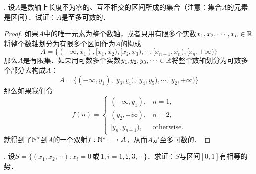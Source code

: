 . 设$A$是数轴上长度不为零的、互不相交的区间所成的集合（注意：集合$A$的元素是区间）．试证：$A$是至多可数的．
\begin{proof}
如果$A$中的唯一元素为整个数轴，或者只用有限多个实数$x_1,x_2,\cdots, x_n \in \mathbb{R}$将整个数轴划分为有限多个区间作为$A$的构成
\begin{equation}
    A = \{ (-\infty, x_1), [x_1, x_2), [x_2, x_3), \cdots, [x_{n-1}, x_n), [x_n, +\infty) \}
\end{equation}
那么$A$是有限集．如果用可数多个实数$y_1, y_2, y_3, \cdots \in \mathbb{R}$将整个数轴划分为可数多个部分去构成$A$：
\begin{equation}
    A = \{ (-\infty, y_1), [y_3, y_4), [y_4, y_5), \cdots, [y_2, +\infty) \}
\end{equation}
那么如果我们令
\begin{equation}
    f(n) = \begin{cases}
        (-\infty, y_1), & n = 1, \\
        (y_2, +\infty), & n = 2, \\
        [y_{n}, y_{n+1}), & \text{otherwise.}
    \end{cases}
\end{equation}
就得到了$\mathbb{N}^\star$到$A$的一个双射$f: \mathbb{N}^\star \longrightarrow A$，从而$A$是至多可数的．
\end{proof}

. 设$S = \{ (x_1, x_2, \cdots) : x_i = 0 \, \text{或} \, 1, i = 1,2,3,\cdots \}$．求证：$S$与区间$[0,1]$有相等的势．

